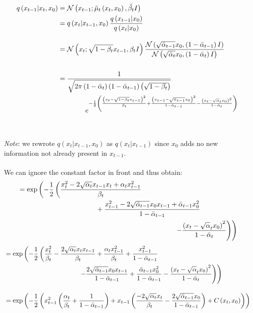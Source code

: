 \documentclass{article}
\begin{document}
\begin{align}
  q\left(x_{t-1} | x_t, x_0\right) &= \mathcal{N}\left(x_{t-1}; \tilde{\mu}_t \left(x_t, x_0\right), \tilde{\beta_t} I\right) \\
  &= q\left(x_t | x_{t-1}, x_0\right) \frac{q\left(x_{t-1}| x_0\right)}{q\left(x_t | x_0\right)} \\[10pt]
  &= \mathcal{N}\left(x_t; \sqrt{1 - \beta_t}x_{t-1}, \beta_t I\right) \frac{\mathcal{N}\left(\sqrt{\bar{\alpha}_{t-1}} x_0, \left(1 - \bar{\alpha}_{t-1}\right)I\right)}{\mathcal{N}\left(\sqrt{\bar{\alpha}_t} x_0, \left(1 - \bar{\alpha}_t\right)I\right)} \\[15pt]
  &= \frac{1}{\sqrt{2 \pi \left(1 - \bar{\alpha}_t\right) \left(1 - \bar{\alpha}_{t-1}\right) \left(\sqrt{1 - \beta_t}\right)}} \notag \\
  &\qquad \qquad e^{- \frac{1}{2} \left(\frac{\left(x_t - \sqrt{1 - \beta_t}x_{t-1}\right)^2}{\beta_t} + \frac{\left(x_{t-1} - \sqrt{\bar{\alpha}_{t-1}}x_0\right)^2}{1 - \bar{\alpha}_{t-1}} - \frac{\left(x_t - \sqrt{\alpha}_t x_0\right)^2}{1 - \bar{\alpha}_{t}}\right)}
\end{align}
\\\\
\textit{Note}: we rewrote $q\left(x_t | x_{t-1}, x_0\right)$ as $q\left(x_t | x_{t-1}\right)$ since $x_0$ adds no new information not already present \indent \indent in $x_{t-1}$.
\\\\
We can ignore the constant factor in front and thus obtain:
\begin{align}
  &= \exp\left(- \frac{1}{2} \left(\frac{x_t^2 - 2 \sqrt{\alpha_t} x_{t-1} x_t + \alpha_t x_{t-1}^2}{\beta_t} \right. \right. \\
  & \hspace{4cm} + \frac{x_{t-1}^2 - 2 \sqrt{\bar{\alpha}_{t-1}} x_0 x_{t-1} + \bar{\alpha}_{t-1} x_0^2}{ 1 - \bar{\alpha}_{t-1}}  \notag \\
  & \left. \left. \hspace{8cm} - \frac{\left(x_t - \sqrt{\alpha}_t x_0\right)^2}{1 - \bar{\alpha}_{t}}\right) \right) \notag
\end{align}
\begin{align}
  &= \exp\left(- \frac{1}{2} \left(\frac{x_t^2}{\beta_t} - \frac{2 \sqrt{\alpha_t} x_t x_{t-1}}{\beta_t} + \frac{\alpha_t x_{t-1}^2}{\beta_t} + \frac{x_{t-1}^2}{1 - \bar{\alpha}_{t-1}} \right. \right. \\
  & \left. \left. \hspace{4cm}  - \frac{2 \sqrt{\bar{\alpha}_{t-1}} x_0 x_{t-1}}{1 - \bar{\alpha}_{t-1}} + \frac{\bar{\alpha}_{t-1} x_0^2}{1 - \bar{\alpha}_{t-1}} - \frac{\left(x_t - \sqrt{\alpha}_t x_0\right)^2}{1 - \bar{\alpha}_{t}}\right) \right) \notag \\[10pt]
  &= \exp\left(- \frac{1}{2} \left(x_{t-1}^2 \left(\frac{\alpha_t}{\beta_t} + \frac{1}{1 - \bar{\alpha}_{t-1}}\right) + x_{t-1} \left(\frac{-2 \sqrt{\alpha_t} x_t}{\beta_t} - \frac{2 \sqrt{\bar{\alpha}_{t-1}} x_0 }{1 - \bar{\alpha}_{t-1}}\right) + C\left(x_t, x_0\right)\right) \right) 
\end{align}
\end{document}
